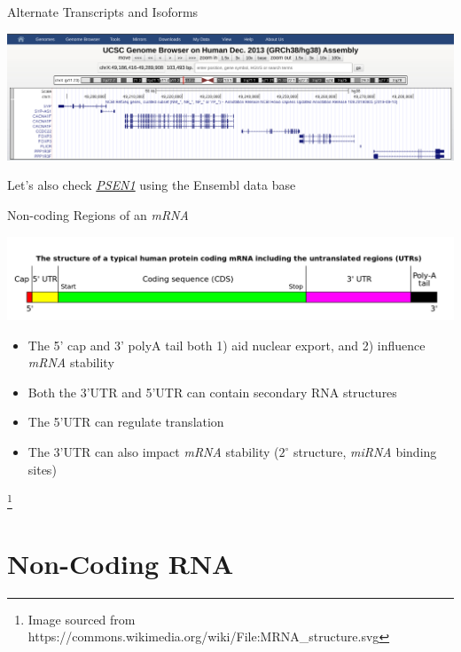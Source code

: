 \documentclass[aspectratio=169,11pt]{beamer}
\newcommand\blfootnote[1]{%
  \begingroup
  \renewcommand\thefootnote{}\footnote{#1}%
  \addtocounter{footnote}{-1}%
  \endgroup
}
\begin{document}
\begin{frame}{Alternate Transcripts and Isoforms}

	\begin{center}
	\includegraphics[scale=0.13]{figures/ucscExample.png} 	
	\end{center}

Let's also check \href{http://asia.ensembl.org/Homo_sapiens/Gene/Summary?db=core;g=ENSG00000080815;r=14:73136418-73223691}{\textit{PSEN1}} using the Ensembl data base

\end{frame}


\begin{frame}{Non-coding Regions of an \textit{mRNA}}

	\begin{center}
	\includegraphics[scale=0.25]{figures/MRNAstructure.png} 
	\end{center}
	
	\begin{itemize}
		\item The 5' cap and 3' polyA tail both 1) aid nuclear export, and 2) influence \textit{mRNA} stability
		\item Both the 3'UTR and 5'UTR can contain secondary RNA structures
		\item The 5'UTR can regulate translation
		\item The 3'UTR can also impact \textit{mRNA} stability ($2^{\circ}$ structure, \textit{miRNA} binding sites)
	\end{itemize}
	
	\blfootnote{Image sourced from https://commons.wikimedia.org/wiki/File:MRNA\_structure.svg}

\end{frame}


\section{Non-Coding RNA}
\end{document}
